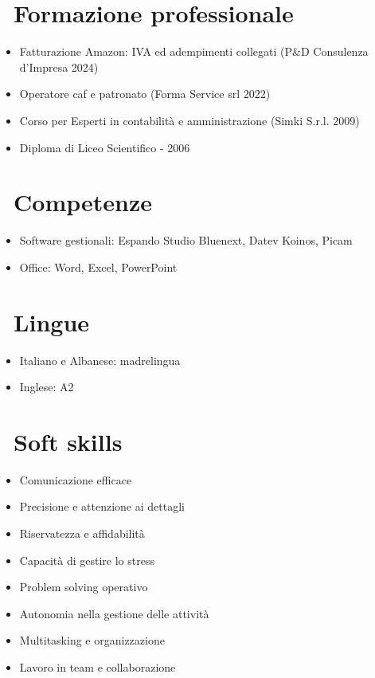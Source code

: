 \documentclass{resume}
\begin{document}
\section{\faInfo\ Formazione professionale}
\begin{itemize}[parsep=0.5ex]
 \item Fatturazione Amazon: IVA ed adempimenti collegati (P\&D Consulenza d'Impresa 2024)
 \item Operatore caf e patronato (Forma Service srl 2022)
 \item Corso per Esperti in contabilità e amministrazione (Simki S.r.l. 2009)
 \item Diploma di Liceo Scientifico - 2006
\end{itemize}

\section{\faCogs\ Competenze}
\begin{itemize}[parsep=0.5ex]
  \item Software gestionali: Espando Studio Bluenext, Datev Koinos, Picam
  \item Office: Word, Excel, PowerPoint
\end{itemize}

\section{\faInfo\ Lingue}
\begin{itemize}[parsep=0.5ex]
  \item Italiano e Albanese: madrelingua
  \item Inglese: A2
\end{itemize}

\section{\faUser\ Soft skills}
\begin{itemize}[parsep=0.5ex]
 \item Comunicazione efficace
 \item Precisione e attenzione ai dettagli
 \item Riservatezza e affidabilità
 \item Capacità di gestire lo stress
 \item Problem solving operativo
 \item Autonomia nella gestione delle attività
 \item Multitasking e organizzazione
 \item Lavoro in team e collaborazione
\end{itemize}
%
%
\end{document}
